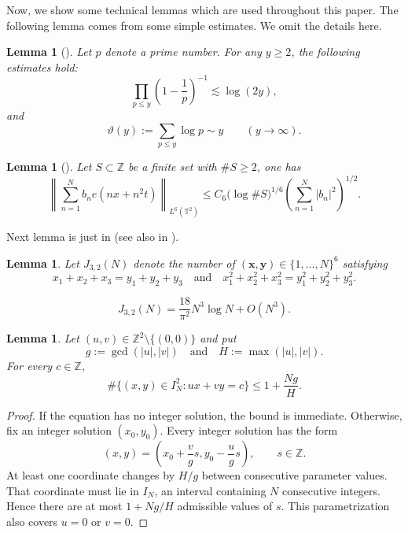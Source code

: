 \documentclass[11pt, twoside]{article}
\numberwithin{equation}{section}
\newtheorem{lemma}[theorem]{Lemma}
\theoremstyle{definition}
\newcommand{\T}{\mathbb T}
\newcommand{\Z}{\mathbb Z}
\begin{document}
Now, we show some technical lemmas which are used throughout this paper. The following lemma comes 
from some simple estimates. We omit the details here.
\begin{lemma}[{\cite[Theorems 2.7 and 6.9]{MontgomeryVaughan2006}}]\label{estimate}
Let $p$ denote a prime number. For any $y \ge 2$, the following estimates hold:
$$
\prod_{p \le y} \left(1 - \frac{1}{p}\right)^{-1} \lesssim \log(2y),
$$
and
$$
\vartheta(y) := \sum_{p \le y} \log p \sim y \qquad (y \to \infty).
$$
\end{lemma}

\begin{lemma}[{\cite[Theorem~1.2]{DFGGL26}}]\label{Guo}
Let $S\subset \mathbb{Z}$ be a finite set with $\# S\ge 2$, one has 
\begin{equation}\label{eq:gly-input}
\left\|\sum_{n=1}^{N}b_ne(nx+n^2t)\right\|_{L^6(\T^2)}\leq C_6\bigl(\log\# S\bigr)^{1/6}
\left(\sum_{n=1}^{N}|b_n|^2\right)^{1/2}.
\end{equation}
\end{lemma}\label{J}
Next lemma is just in \cite{Rogovskaya1986} (see also in \cite{VaughanWooley1997}).
\begin{lemma}
Let $J_{3,2}(N)$ denote the number of $(\bm x,\bm y)\in\{1,\ldots,N\}^6$ satisfying
$$
x_1+x_2+x_3=y_1+y_2+y_3\quad\text{and}\quad
x_1^2+x_2^2+x_3^2=y_1^2+y_2^2+y_3^2.
$$

\begin{equation}\label{eq:J-asymptotic}
J_{3,2}(N)=\frac{18}{\pi^2}N^3\log N+O(N^3).
\end{equation}
\end{lemma}

\begin{lemma}\label{lem:integer-line}
Let $(u,v)\in\Z^2\setminus\{(0,0)\}$ and put
$$
g:=\gcd(|u|,|v|) \quad\text{and}\quad H:=\max(|u|,|v|).
$$
For every $c\in\Z$,
$$
\#\{(x,y)\in I_N^2:ux+vy=c\}\leq1+\frac{Ng}{H}.
$$
\end{lemma}

\begin{proof}
If the equation has no integer solution, the bound is immediate.
Otherwise, fix an integer solution $(x_0,y_0)$.  Every integer solution has
the form
$$
(x,y)=\left(x_0+\frac vg s,y_0-\frac ug s\right),
\qquad s\in\Z.
$$
At least one coordinate changes by $H/g$ between consecutive parameter
values.  That coordinate must lie in $I_N$, an interval containing $N$
consecutive integers.  Hence there are at most $1+Ng/H$ admissible values of
$s$.  This parametrization also covers $u=0$ or $v=0$.
\end{proof}
\end{document}

